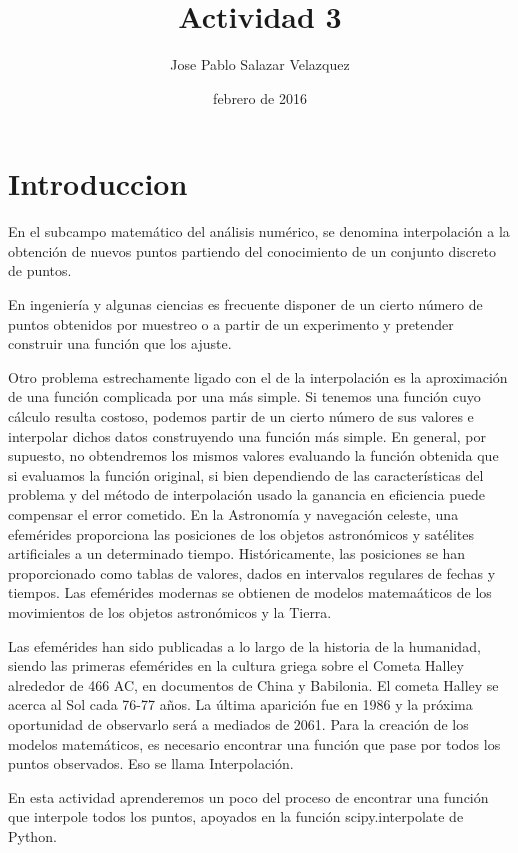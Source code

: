 \documentclass[a4paper]{article}
\title{Actividad 3}
\author{Jose Pablo Salazar Velazquez}
\date{febrero de 2016}
\begin{document}
\maketitle

\begin{abstract}
\end{abstract}

\section{Introduccion}
En el subcampo matemático del análisis numérico, se denomina interpolación a la obtención de nuevos puntos partiendo del conocimiento de un conjunto discreto de puntos.

En ingeniería y algunas ciencias es frecuente disponer de un cierto número de puntos obtenidos por muestreo o a partir de un experimento y pretender construir una función que los ajuste.

Otro problema estrechamente ligado con el de la interpolación es la aproximación de una función complicada por una más simple. Si tenemos una función cuyo cálculo resulta costoso, podemos partir de un cierto número de sus valores e interpolar dichos datos construyendo una función más simple. En general, por supuesto, no obtendremos los mismos valores evaluando la función obtenida que si evaluamos la función original, si bien dependiendo de las características del problema y del método de interpolación usado la ganancia en eficiencia puede compensar el error cometido.
En la Astronomía y navegación celeste, una efemérides proporciona las posiciones de los objetos astronómicos y satélites artificiales a un determinado tiempo. Históricamente, las posiciones se han proporcionado como tablas de valores, dados en intervalos regulares de fechas y tiempos. Las efemérides modernas se obtienen de modelos matemaáticos de los movimientos de los objetos astronómicos y la Tierra. 
 
 
Las efemérides han sido publicadas a lo largo de la historia de la humanidad, siendo las primeras efemérides en la cultura griega sobre el Cometa Halley alrededor de 466 AC, en  documentos de China y Babilonia. El cometa Halley se acerca al Sol cada 76-77 años. La última aparición fue en 1986 y la próxima oportunidad de observarlo será a mediados de 2061.
Para la creación  de los modelos matemáticos, es necesario encontrar una función que pase por todos los puntos observados. Eso se llama Interpolación.
 
En esta actividad aprenderemos un poco del proceso de encontrar una función que interpole todos los puntos, apoyados en la función scipy.interpolate de Python.
\end{document}
